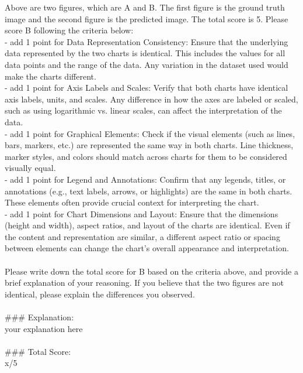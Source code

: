 \onecolumn
\begin{tcolorbox}[colback=blue!5!white, colframe=blue!75!black, title=Prompt for VLM-as-a-judge, text width=\textwidth]
Above are two figures, which are A and B. The first figure is the ground truth image and the second figure is the predicted image. The total score is 5. Please score B following the criteria below:\\
- add 1 point for Data Representation Consistency: Ensure that the underlying data represented by the two charts is identical. This includes the values for all data points and the range of the data. Any variation in the dataset used would make the charts different.\\
- add 1 point for Axis Labels and Scales: Verify that both charts have identical axis labels, units, and scales. Any difference in how the axes are labeled or scaled, such as using logarithmic vs. linear scales, can affect the interpretation of the data.\\
- add 1 point for Graphical Elements: Check if the visual elements (such as lines, bars, markers, etc.) are represented the same way in both charts. Line thickness, marker styles, and colors should match across charts for them to be considered visually equal.\\
- add 1 point for Legend and Annotations: Confirm that any legends, titles, or annotations (e.g., text labels, arrows, or highlights) are the same in both charts. These elements often provide crucial context for interpreting the chart.\\
- add 1 point for Chart Dimensions and Layout: Ensure that the dimensions (height and width), aspect ratios, and layout of the charts are identical. Even if the content and representation are similar, a different aspect ratio or spacing between elements can change the chart’s overall appearance and interpretation.\\
\\
Please write down the total score for B based on the criteria above, and provide a brief explanation of your reasoning. If you believe that the two figures are not identical, please explain the differences you observed.\\
\\
\#\#\# Explanation:\\
your explanation here\\
\\
\#\#\# Total Score:\\
x/5
\end{tcolorbox}